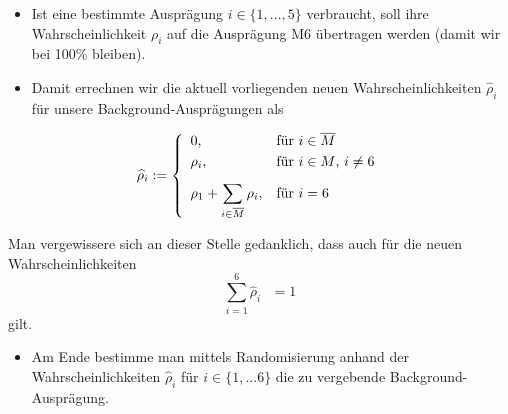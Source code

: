 \begin{Algo}
\begin{itemize}
    \item Ist eine bestimmte Ausprägung $i \in \lbrace 1,...,5 \rbrace$ verbraucht, soll ihre Wahrscheinlichkeit $\rho_i$ auf die Ausprägung M6 übertragen werden (damit wir bei 100\% bleiben).

    \item Damit errechnen wir die aktuell vorliegenden neuen Wahrscheinlichkeiten $\widehat{\rho}_i$ für unsere Background-Ausprägungen als
\end{itemize} 

\[
\widehat{\rho}_i:=\left\{%
\begin{array}{ll}
	\hbox{0,} & \hbox{für $i \in \overline{M}$} \\[0,1cm] 
    \hbox{$\rho_i$,} & \hbox{für $i \in M$, $i \neq 6$} \\[0,3cm]
    \displaystyle \rho_1 + \sum_{i \in \overline{M}} \rho_i, & \hbox{für $i = 6$} \\
\end{array}%
\right.
\]

Man vergewissere sich an dieser Stelle gedanklich, dass auch für die neuen \newline Wahrscheinlichkeiten \[\sum_{i = 1}^6 \widehat{\rho}_i \textrm{ } = 1\] gilt.

\begin{itemize}
    \item Am Ende bestimme man mittels Randomisierung anhand der Wahrscheinlichkeiten $\widehat{\rho}_i$ für $i \in \lbrace 1,...6 \rbrace$ die zu vergebende Background-Ausprägung. 
\end{itemize}

\end{Algo}

\vspace{0.3cm}

